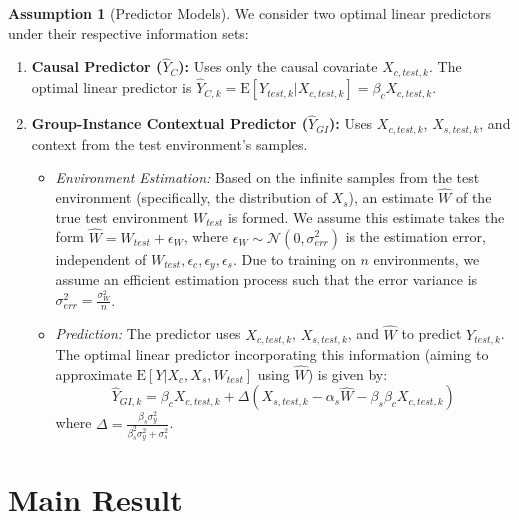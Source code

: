 \documentclass{article}
\theoremstyle{definition}
\newtheorem{assumption}[theorem]{Assumption}
\theoremstyle{remark}
\newcommand{\E}{\mathrm{E}}
\newcommand{\N}{\mathcal{N}} %
\begin{document}
\begin{assumption}[Predictor Models] \label{ass:predictors}
We consider two optimal linear predictors under their respective information sets:
\begin{enumerate}
    \item \textbf{Causal Predictor ($\hat{Y}_C$):} Uses only the causal covariate $X_{c,test,k}$. The optimal linear predictor is $\hat{Y}_{C,k} = \E[Y_{test,k} | X_{c,test,k}] = \beta_c X_{c,test,k}$.
    \item \textbf{Group-Instance Contextual Predictor ($\hat{Y}_{GI}$):} Uses $X_{c,test,k}$, $X_{s,test,k}$, and context from the test environment's samples.
        \begin{itemize}
            \item \textit{Environment Estimation:} Based on the infinite samples from the test environment (specifically, the distribution of $X_s$), an estimate $\hat{W}$ of the true test environment $W_{test}$ is formed. We assume this estimate takes the form $\hat{W} = W_{test} + \epsilon_W$, where $\epsilon_W \sim \N(0, \sigma_{err}^2)$ is the estimation error, independent of $W_{test}, \epsilon_c, \epsilon_y, \epsilon_s$. Due to training on $n$ environments, we assume an efficient estimation process such that the error variance is $\sigma_{err}^2 = \frac{\sigma_W^2}{n}$.
            \item \textit{Prediction:} The predictor uses $X_{c,test,k}$, $X_{s,test,k}$, and $\hat{W}$ to predict $Y_{test,k}$. The optimal linear predictor incorporating this information (aiming to approximate $\E[Y | X_c, X_s, W_{test}]$ using $\hat{W}$) is given by:
            \[ \hat{Y}_{GI, k} = \beta_c X_{c,test,k} + \Delta (X_{s,test,k} - \alpha_s \hat{W} - \beta_s \beta_c X_{c,test,k}) \]
            where $\Delta = \frac{\beta_s \sigma_y^2}{\beta_s^2 \sigma_y^2 + \sigma_s^2}$.
        \end{itemize}
\end{enumerate}
\end{assumption}

\section{Main Result}
\end{document}
